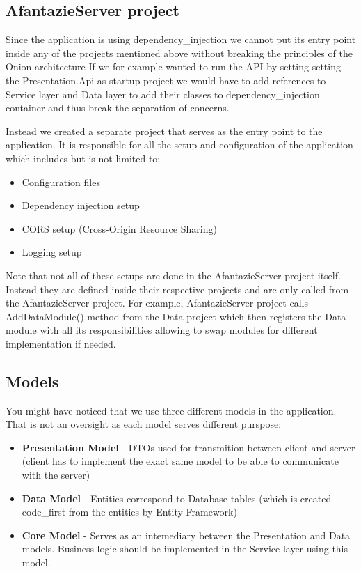 \subsection*{AfantazieServer project}
Since the application is using \gls{dependency_injection}
we cannot put its entry point inside any of the projects mentioned above without breaking the principles of the Onion architecture \cite{onion_architecture}
If we for example wanted to run the API by setting setting the Presentation.Api as startup project we would have to add
references to Service layer and Data layer to add their classes to \gls{dependency_injection} container and thus break the separation of concerns.

Instead we created a separate project that serves as the entry point to the application.
It is responsible for all the setup and configuration of the application which includes but is not limited to:
\begin{itemize}
    \item Configuration files 
    \item Dependency injection setup
    \item CORS setup (Cross-Origin Resource Sharing)
    \item Logging setup
\end{itemize}

Note that not all of these setups are done in the AfantazieServer project itself.
Instead they are defined inside their respective projects and are only called from the AfantazieServer project.
For example, AfantazieServer project calls AddDataModule() method from the Data project
which then registers the Data module with all its responsibilities allowing to swap modules for different implementation if needed.

\subsection*{Models}
You might have noticed that we use three different models in the application.
That is not an oversight as each model serves different purspose:
\begin{itemize}
    \item \textbf{Presentation Model} - DTOs used for transmition between client and server
    (client has to implement the exact same model to be able to communicate with the server)
    \item \textbf{Data Model} - Entities correspond to Database tables
    (which is created \gls{code_first} from the entities by Entity Framework)
    \item \textbf{Core Model} - Serves as an intemediary between the Presentation and Data models.
    Business logic should be implemented in the Service layer using this model.
\end{itemize}


